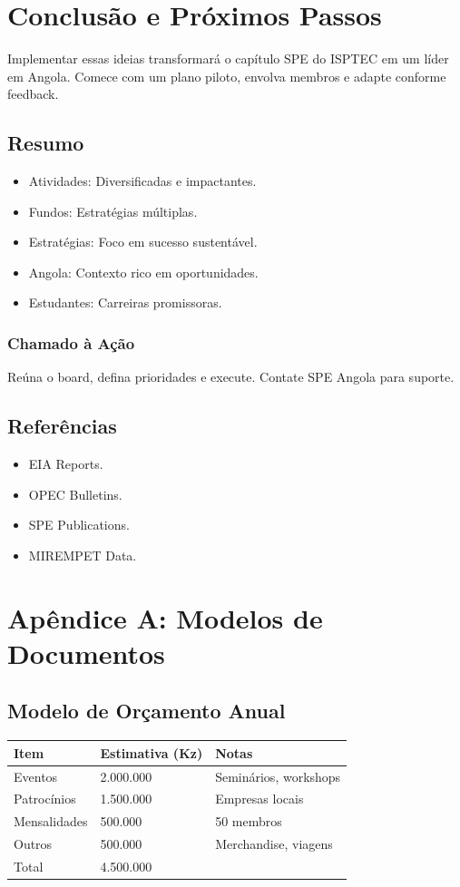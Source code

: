 \documentclass[12pt]{article}
\begin{document}
\newpage

\section{Conclusão e Próximos Passos}

Implementar essas ideias transformará o capítulo SPE do ISPTEC em um líder em Angola. Comece com um plano piloto, envolva membros e adapte conforme feedback.

\subsection{Resumo}
\begin{itemize}
    \item Atividades: Diversificadas e impactantes.
    \item Fundos: Estratégias múltiplas.
    \item Estratégias: Foco em sucesso sustentável.
    \item Angola: Contexto rico em oportunidades.
    \item Estudantes: Carreiras promissoras.
\end{itemize}

\subsubsection{Chamado à Ação}
Reúna o board, defina prioridades e execute. Contate SPE Angola para suporte.

\subsection{Referências}
\begin{itemize}
    \item EIA Reports.
    \item OPEC Bulletins.
    \item SPE Publications.
    \item MIREMPET Data.
\end{itemize}

\appendix
\clearpage
\section{Apêndice A: Modelos de Documentos}

\subsection{Modelo de Orçamento Anual}
\begin{longtable}{|l|l|l|}
\hline
Item & Estimativa (Kz) & Notas \\
\hline
Eventos & 2.000.000 & Seminários, workshops \\
Patrocínios & 1.500.000 & Empresas locais \\
Mensalidades & 500.000 & 50 membros \\
Outros & 500.000 & Merchandise, viagens \\
\hline
Total & 4.500.000 & \\
\hline
\end{longtable}
\end{document}
